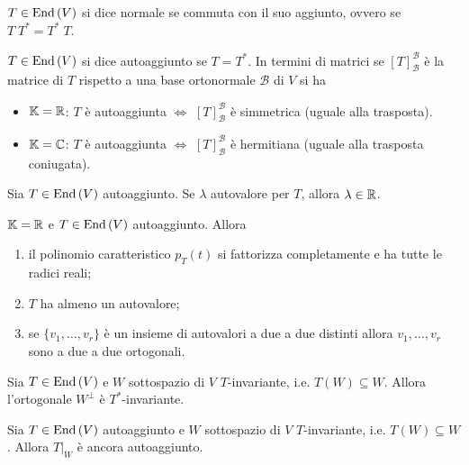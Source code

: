 \begin{definition}
	$ T \in \operatorname{End}{(V)} $ si dice normale se commuta con il suo aggiunto, ovvero se $ T \; T^{*} = T^{*} \; T $.
\end{definition}

\begin{definition}
	$ T \in \operatorname{End}{(V)} $ si dice autoaggiunto se $ T = T^{*} $. In termini di matrici se $ [T]_{\mathscr{B}}^{\mathscr{B}} $ è la matrice di $ T $ rispetto a una base ortonormale $ \mathscr{B} $ di $ V $ si ha
	\begin{itemize}
		\item $ \mathbb{K} = \mathbb{R} $: $ T $ è autoaggiunta $ \iff $ $ [T]_{\mathscr{B}}^{\mathscr{B}} $ è simmetrica (uguale alla trasposta).
		\item $ \mathbb{K} = \mathbb{C} $: $ T $ è autoaggiunta $ \iff $ $ [T]_{\mathscr{B}}^{\mathscr{B}} $ è hermitiana (uguale alla trasposta coniugata).
	\end{itemize}
\end{definition}

\begin{thm}
	Sia $ T \in \operatorname{End}{(V)} $ autoaggiunto. Se $ \lambda $ autovalore per $ T $, allora $ \lambda \in \mathbb{R} $. 
\end{thm}

\begin{thm}
	$ \mathbb{K} = \mathbb{R} $ e $ T \in \operatorname{End}{(V)} $ autoaggiunto. Allora
	\begin{enumerate}[label = (\roman*)]
		\item il polinomio caratteristico $ p_T(t) $ si fattorizza completamente e ha tutte le radici reali;
		\item $ T $ ha almeno un autovalore;
		\item se $ \{v_1, \ldots, v_r\} $ è un insieme di autovalori a due a due distinti allora $ v_1, \ldots, v_r $ sono a due a due ortogonali.
	\end{enumerate}
\end{thm}

\begin{prop}
	Sia $ T \in \operatorname{End}{(V)} $ e $ W $ sottospazio di $ V $ $ T $-invariante, i.e. $ T(W) \subseteq W $. Allora l'ortogonale $ W^{\perp} $ è $ T^{*} $-invariante.
\end{prop}

\begin{prop}
	Sia $ T \in \operatorname{End}{(V)} $ autoaggiunto e $ W $ sottospazio di $ V $ $ T $-invariante, i.e. $ T(W) \subseteq W $. Allora $ T\lvert_{W} $ è ancora autoaggiunto.
\end{prop}

